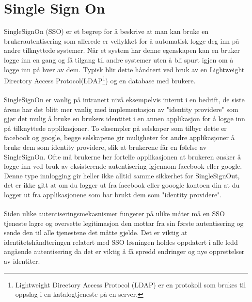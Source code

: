 \section{Single Sign On}
\label{sec:teoridel_singleSignOn}
SingleSignOn (SSO) er et begrep for å beskrive at man kan bruke en brukerautentisering som allerede er vellykket for å automatisk logge deg inn på andre tilknyttede systemer. Når et system har denne egenskapen kan en bruker logge inn en gang og få tilgang til andre systemer uten å bli spurt igjen om å logge inn på hver av dem\cite{SSOLogg}. Typisk blir dette håndtert ved bruk av en Lightweight Directory Access Protocol\cite{SSOLDAP}(LDAP\footnote{Lightweight Directory Access Protocol (LDAP) er en protokoll som brukes til oppslag i en katalogtjeneste på en server.}) og en database med brukere. \\
\\
SingleSignOn er vanlig på intranett nivå eksempelvis internt i en bedrift, de siste årene har det blitt mer vanlig med implementasjon av "identity providere" som gjør det mulig å bruke en brukers identitet i en annen applikasjon for å logge inn på tilknyttede applikasjoner. To eksempler på selskaper som tilbyr dette er facebook og google, begge selskapene gir muligheter for andre applikasjoner å bruke dem som identity providere, slik at brukerene får en følelse av SingleSignOn. Ofte må brukerne her fortelle applikasjonen at brukeren ønsker å logge inn ved bruk av eksisterende autentisering igjennom facebook eller google. Denne type innlogging gir heller ikke alltid samme sikkerhet for SingleSignOut, det er ikke gitt at om du logger ut fra facebook eller gooogle kontoen din at du logger ut fra applikasjonene som har brukt dem som "identity providere". \\
\\
Siden ulike autentiseringsmekasnismer fungerer på ulike måter må en SSO tjeneste lagre og oversette legitimasjon den mottar fra sin første autentisering og sende den til alle tjenestene det måtte gjelde. Det er viktig at identitetshåndteringen relatert med SSO løsningen holdes oppdatert i alle ledd angående autentisering da det er viktig å få spredd endringer og nye opprettelser av identiter. \cite{SSOProblemer}

